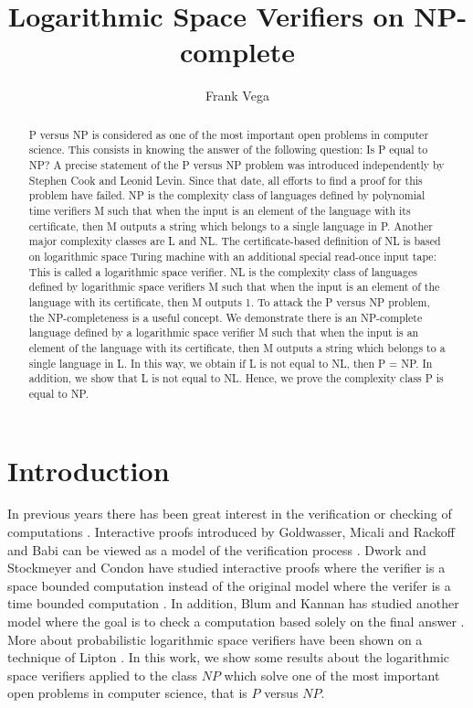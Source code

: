 \documentclass[a4paper,UKenglish,cleveref, autoref]{lipics-v2019}
\title{Logarithmic Space Verifiers on NP-complete} %
\author{Frank Vega}{Joysonic, Uzun Mirkova 5, Belgrade, 11000, Serbia} {vega.frank@gmail.com}{https://orcid.org/0000-0001-8210-4126}{}
\begin{document}
\maketitle

\begin{abstract}
P versus NP is considered as one of the most important open problems in computer science. This consists in knowing the answer of the following question: Is P equal to NP? A precise statement of the P versus NP problem was introduced independently by Stephen Cook and Leonid Levin. Since that date, all efforts to find a proof for this problem have failed. NP is the complexity class of languages defined by polynomial time verifiers M such that when the input is an element of the language with its certificate, then M outputs a string which belongs to a single language in P. Another major complexity classes are L and NL. The certificate-based definition of NL is based on logarithmic space Turing machine with an additional special read-once input tape: This is called a logarithmic space verifier. NL is the complexity class of languages defined by logarithmic space verifiers M such that when the input is an element of the language with its certificate, then M outputs 1. To attack the P versus NP problem, the NP-completeness is a useful concept. We demonstrate there is an NP-complete language defined by a logarithmic space verifier M such that when the input is an element of the language with its certificate, then M outputs a string which belongs to a single language in L. In this way, we obtain if L is not equal to NL, then P = NP. In addition, we show that L is not equal to NL. Hence, we prove the complexity class P is equal to NP.
\end{abstract}

\section{Introduction}

In previous years there has been great interest in the verification or checking of computations \cite{LIP90}. Interactive proofs introduced by Goldwasser, Micali and Rackoff and Babi can be viewed as a model of the verification process \cite{LIP90}. Dwork and Stockmeyer and Condon have studied interactive proofs where the verifier is a space bounded computation instead of the original model where the verifer is a time bounded computation \cite{LIP90}. In addition, Blum and Kannan has studied another model where the goal is to check a computation based solely on the final answer \cite{LIP90}. More about probabilistic logarithmic space verifiers have been shown on a technique of Lipton \cite{LIP90}. In this work, we show some results about the logarithmic space verifiers applied to the class $NP$ which solve one of the most important open problems in computer science, that is $P$ versus $NP$.
\end{document}
